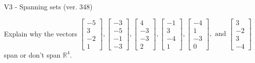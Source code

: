 \begin{exercise}
  \begin{exerciseTitle}V3 - Spanning sets (ver. 348)\end{exerciseTitle}
  \begin{exerciseStatement}
    Explain why the vectors \(\left[\begin{array}{r}
-5 \\
3 \\
-2 \\
1
\end{array}\right] , \left[\begin{array}{r}
-3 \\
-5 \\
-1 \\
-3
\end{array}\right] , \left[\begin{array}{r}
4 \\
-3 \\
-3 \\
2
\end{array}\right] , \left[\begin{array}{r}
-1 \\
3 \\
-4 \\
1
\end{array}\right] , \left[\begin{array}{r}
-4 \\
1 \\
-3 \\
0
\end{array}\right] , \text{ and } \left[\begin{array}{r}
3 \\
-2 \\
3 \\
-4
\end{array}\right]\) span or don't span \(\mathbb{R}^4\). 
	



\end{exerciseStatement}
\end{exercise}
